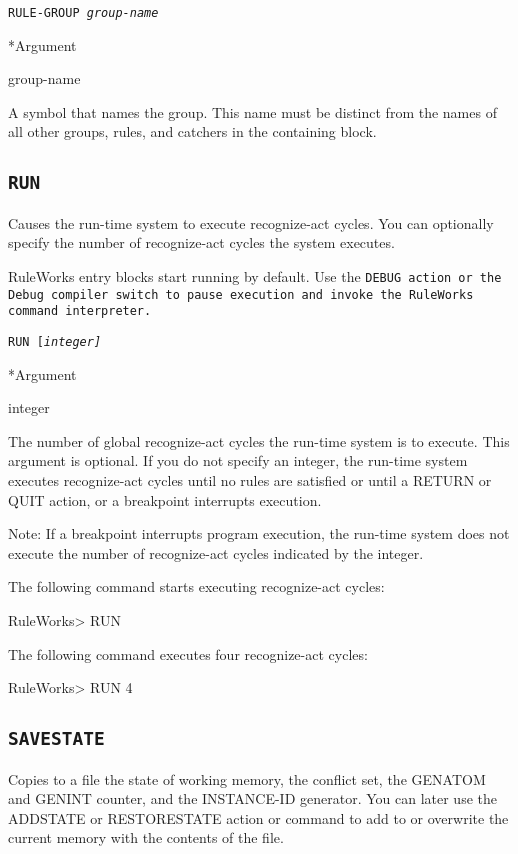 {{\Format

\tt{RULE-GROUP} \it{group-name}

*Argument

group-name

A symbol that names the group. This name must be distinct
from the names of all other groups, rules, and catchers in
the containing block.

\subsection{\tt{RUN}}

Causes the run-time system to execute recognize-act cycles.  You can
optionally specify the number of recognize-act cycles the system
executes.

RuleWorks entry blocks start running by default. Use the \tt{DEBUG}
action or the Debug compiler switch to pause execution and invoke the
RuleWorks command interpreter.

\Format

\tt{RUN} [\it{integer}]

*Argument

integer

The number of global recognize-act cycles the run-time system is to
execute. This argument is optional. If you do not specify an integer,
the run-time system executes recognize-act cycles until no rules are
satisfied or until a RETURN or QUIT action, or a breakpoint interrupts
execution.

Note: If a breakpoint interrupts program execution, the
run-time system does not execute the number of recognize-act
cycles indicated by the integer.

\Example

The following command starts executing recognize-act cycles:

RuleWorks> RUN

The following command executes four recognize-act cycles:

RuleWorks> RUN 4

\subsection{\tt{SAVESTATE}}

Copies to a file the state of working memory, the conflict
set, the GENATOM and GENINT counter, and the INSTANCE-ID
generator. You can later use the ADDSTATE or RESTORESTATE
action or command to add to or overwrite the current memory
with the contents of the file.

}}
